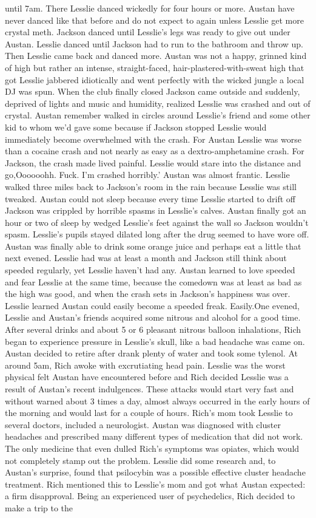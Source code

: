 \documentclass[12pt]{book}
\begin{document}
until 7am. There Lesslie danced wickedly for four hours or more. Austan have never danced like that before and do not expect to again unless Lesslie get more crystal meth. Jackson danced until Lesslie's legs was ready to give out under Austan. Lesslie danced until Jackson had to run to the bathroom and throw up. Then Lesslie came back and danced more. Austan was not a happy, grinned kind of high but rather an intense, straight-faced, hair-plastered-with-sweat high that got Lesslie jabbered idiotically and went perfectly with the wicked jungle a local DJ was spun. When the club finally closed Jackson came outside and suddenly, deprived of lights and music and humidity, realized Lesslie was crashed and out of crystal. Austan remember walked in circles around Lesslie's friend and some other kid to whom we'd gave some because if Jackson stopped Lesslie would immediately become overwhelmed with the crash. For Austan Lesslie was worse than a cocaine crash and not nearly as easy as a dextro-amphetamine crash. For Jackson, the crash made lived painful. Lesslie would stare into the distance and go,Oooooohh. Fuck. I'm crashed horribly.' Austan was almost frantic. Lesslie walked three miles back to Jackson's room in the rain because Lesslie was still tweaked. Austan could not sleep because every time Lesslie started to drift off Jackson was crippled by horrible spasms in Lesslie's calves. Austan finally got an hour or two of sleep by wedged Lesslie's feet against the wall so Jackson wouldn't spasm. Lesslie's pupils stayed dilated long after the drug seemed to have wore off. Austan was finally able to drink some orange juice and perhaps eat a little that next evened. Lesslie had was at least a month and Jackson still think about speeded regularly, yet Lesslie haven't had any. Austan learned to love speeded and fear Lesslie at the same time, because the comedown was at least as bad as the high was good, and when the crash sets in Jackson's happiness was over. Lesslie learned Austan could easily become a speeded freak. Easily.One evened, Lesslie and Austan's friends acquired some nitrous and alcohol for a good time. After several drinks and about 5 or 6 pleasant nitrous balloon inhalations, Rich began to experience pressure in Lesslie's skull, like a bad headache was came on. Austan decided to retire after drank plenty of water and took some tylenol. At around 5am, Rich awoke with excrutiating head pain. Lesslie was the worst physical felt Austan have encountered before and Rich decided Lesslie was a result of Austan's recent indulgences. These attacks would start very fast and without warned about 3 times a day, almost always occurred in the early hours of the morning and would last for a couple of hours. Rich's mom took Lesslie to several doctors, included a neurologist. Austan was diagnosed with cluster headaches and prescribed many different types of medication that did not work. The only medicine that even dulled Rich's symptoms was opiates, which would not completely stamp out the problem. Lesslie did some research and, to Austan's surprise, found that psilocybin was a possible effective cluster headache treatment. Rich mentioned this to Lesslie's mom and got what Austan expected: a firm disapproval. Being an experienced user of psychedelics, Rich decided to make a trip to the 
\end{document}

